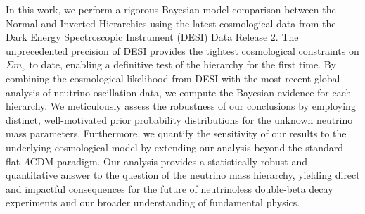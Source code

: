 \documentclass[]{article}
\begin{document}
In this work, we perform a rigorous Bayesian model comparison between the Normal and Inverted Hierarchies using the latest cosmological data from the Dark Energy Spectroscopic Instrument (DESI) Data Release 2. The unprecedented precision of DESI provides the tightest cosmological constraints on $\Sigma m_\nu$ to date, enabling a definitive test of the hierarchy for the first time. By combining the cosmological likelihood from DESI with the most recent global analysis of neutrino oscillation data, we compute the Bayesian evidence for each hierarchy. We meticulously assess the robustness of our conclusions by employing distinct, well-motivated prior probability distributions for the unknown neutrino mass parameters. Furthermore, we quantify the sensitivity of our results to the underlying cosmological model by extending our analysis beyond the standard flat $\Lambda$CDM paradigm. Our analysis provides a statistically robust and quantitative answer to the question of the neutrino mass hierarchy, yielding direct and impactful consequences for the future of neutrinoless double-beta decay experiments and our broader understanding of fundamental physics.
\end{document}
